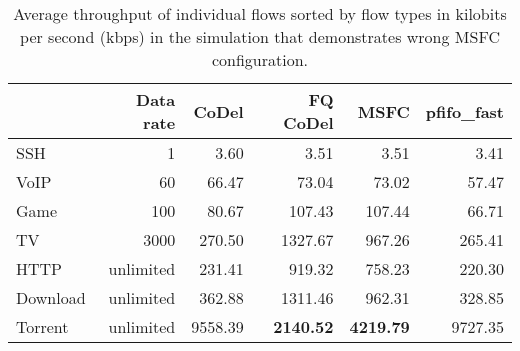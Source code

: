 \begin{table}
	\centering
	\begin{tabular}{@{}l|rrrrr@{}}
		\toprule
		         & {Data rate} & {CoDel} &   {FQ CoDel} &       {MSFC} & {pfifo\_fast} \\ \midrule
		SSH      &           1 &    3.60 &         3.51 &         3.51 &          3.41 \\
		VoIP     &          60 &   66.47 &        73.04 &        73.02 &         57.47 \\
		Game     &         100 &   80.67 &       107.43 &       107.44 &         66.71 \\
		TV       &        3000 &  270.50 &      1327.67 &       967.26 &        265.41 \\
		HTTP     &   unlimited &  231.41 &       919.32 &       758.23 &        220.30 \\
		Download &   unlimited &  362.88 &      1311.46 &       962.31 &        328.85 \\
		Torrent  &   unlimited & 9558.39 & \bf{2140.52} & \bf{4219.79} &       9727.35 \\ \bottomrule
	\end{tabular}
	\caption{Average throughput of individual flows sorted by flow types in kilobits per second (kbps) in the simulation that demonstrates wrong MSFC configuration.}
	\label{tab:throughput_B}
\end{table}









